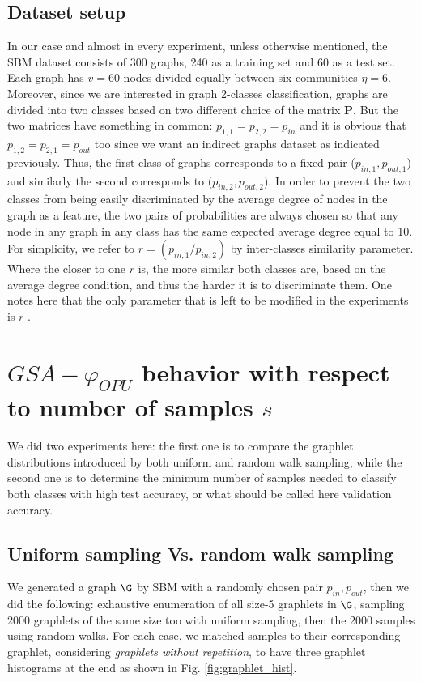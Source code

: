 \subsection{Dataset setup}
In our case and almost in every experiment, unless otherwise mentioned, the SBM dataset consists of 300 graphs, 240 as a training set and 60 as a test set. Each graph has $v=60$ nodes divided equally between six communities $\eta=6$. Moreover, since we are interested in graph 2-classes classification, graphs are divided into two classes based on two different choice of the matrix $\mathbf{P}$. But the two matrices have something in common:  $p_{1,1}= p_{2,2} = p_{in}$ and it is obvious that  $p_{1,2}=p_{2,1}=p_{out}$ too since we want an indirect graphs dataset as indicated previously.\newline
Thus, the first class of graphs corresponds to a fixed pair ($p_{in,1}, p_{out,1}$) and similarly the second   corresponds to ($p_{in,2}, p_{out,2}$). \newline 
In order to prevent the two classes from being easily discriminated by the average degree of nodes in the graph as a feature, the two pairs of probabilities are always chosen so that any node in any graph in any class has the same expected average degree equal to 10. For simplicity, we refer to $r=(p_{in,1}/p_{in,2})$ by inter-classes similarity parameter. Where the closer to one $r$ is, the more similar both classes are, based on the average degree condition,  and thus the harder it is to discriminate them. One notes here that the only parameter that is left to be modified in the experiments is $r$ .


\section{$GSA-\varphi_{OPU}$ behavior with respect to number of samples $s$}
We did two experiments here: the first one is to compare the graphlet distributions introduced by both uniform and random walk sampling, while the second one is to determine the minimum number of samples needed to classify both classes with high test accuracy, or what should be called here validation accuracy.\newline
\subsection{Uniform sampling Vs. random walk sampling}
We generated a graph $\G$ by SBM with a randomly chosen pair $p_{in},p_{out}$, then we did the following: exhaustive enumeration of all size-5 graphlets in $\G$,  sampling 2000 graphlets of the same size too with uniform sampling, then the 2000 samples using random walks. For each case, we matched samples to their corresponding graphlet, considering \emph{graphlets without repetition}, to have three graphlet histograms at the end as shown in Fig. \ref{fig:graphlet_hist}. 


